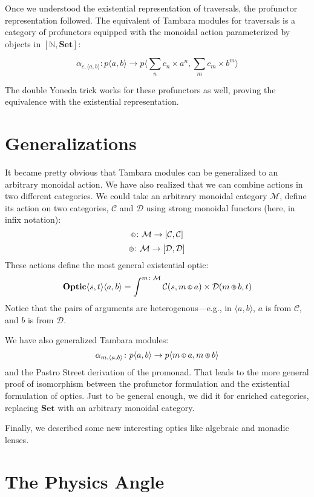 \documentclass[11pt]{amsart}
\newcommand*\circled[3]
  {\tikz[baseline={([yshift=#2]current bounding box.center)}]{
      \node[shape=circle,draw,inner sep=#1] (char) {#3};}}
\newcommand{\actL}{\mathbin{\circled{0.5pt}{-0.55ex}{\scalebox{0.75}{\tiny{$\mathsf{L}$}}}}}
\newcommand{\actR}{\mathbin{\circled{0.5pt}{-0.55ex}{\scalebox{0.75}{\tiny{$\mathsf{R}$}}}}}
\begin{document}
Once we understood the existential representation of traversals, the profunctor representation followed. The equivalent of Tambara modules for traversals is a category of profunctors equipped with the monoidal action parameterized by objects in $[\mathbb{N}, \mathbf{Set}]$:

\[ \alpha_{c, \langle a, b \rangle} \colon p \langle a, b \rangle \to p\langle \sum_n c_n \times a^n, \sum_m c_m \times b^m \rangle \]

The double Yoneda trick works for these profunctors as well, proving the equivalence with the existential representation.

\section{Generalizations}

It became pretty obvious that Tambara modules can be generalized to an arbitrary monoidal action. We have also realized that we can combine actions in two different categories. We could take an arbitrary monoidal category $\mathcal{M}$, define its action on two categories, $\mathcal{C}$ and $\mathcal{D}$ using strong monoidal functors (here, in infix notation):
\[ \actL \colon \mathcal{M} \to [\mathcal{C}, \mathcal{C}] \]
\[ \actR \colon \mathcal{M} \to [\mathcal{D}, \mathcal{D}] \]
These actions define the most general existential optic:
\[ \mathbf{Optic} \langle s, t \rangle \langle a, b \rangle = \int^{m \colon \mathcal{M}} \mathcal{C}(s, m \actL a) \times \mathcal{D}(m \actR b, t)\]
Notice that the pairs of arguments are heterogenous---e.g., in $\langle a, b \rangle$, $a$ is from $ \mathcal{C}$, and $b$ is from $ \mathcal{D}$.

We have also generalized Tambara modules:
\[ \alpha_{m, \langle a, b \rangle} \colon p \langle a, b \rangle \to p \langle m \actL a, m \actR b\rangle \]
and the Pastro Street derivation of the promonad. That leads to the more general proof of isomorphism between the profunctor formulation and the existential formulation of optics. Just to be general enough, we did it for enriched categories, replacing $\mathbf{Set}$ with an arbitrary monoidal category. 

Finally, we described some new interesting optics like algebraic and monadic lenses.

\section{The Physics Angle}
\end{document}
